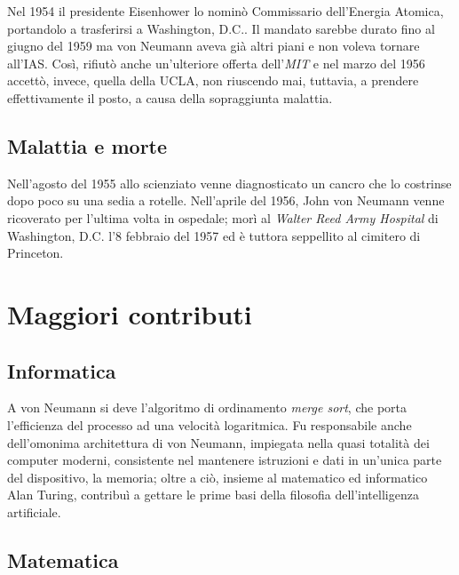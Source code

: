 \documentclass[a4paper, 12pt]{article}
\begin{document}
Nel 1954 il presidente Eisenhower lo nominò Commissario dell'Energia Atomica, portandolo a trasferirsi a Washington, D.C.. Il mandato sarebbe durato fino al giugno del 1959 ma von Neumann aveva già altri piani e non voleva tornare all'IAS. Così, rifiutò anche un'ulteriore offerta dell'\textit{MIT} e nel marzo del 1956 accettò, invece, quella della UCLA, non riuscendo mai, tuttavia, a prendere effettivamente il posto, a causa della sopraggiunta malattia.

\subsection{Malattia e morte}

Nell'agosto del 1955 allo scienziato venne diagnosticato un cancro che lo costrinse dopo poco su una sedia a rotelle. Nell'aprile del 1956, John von Neumann venne ricoverato per l'ultima volta in ospedale; morì al \textit{Walter Reed Army Hospital} di Washington, D.C. l'8 febbraio del 1957 ed è tuttora seppellito al cimitero di Princeton.

\section{Maggiori contributi}

\subsection{Informatica}

A von Neumann si deve l'algoritmo di ordinamento \textit{merge sort}, che porta l'efficienza del processo ad una velocità logaritmica. Fu responsabile anche dell'omonima architettura di von Neumann, impiegata nella quasi totalità dei computer moderni, consistente nel mantenere istruzioni e dati in un'unica parte del dispositivo, la memoria; oltre a ciò, insieme al matematico ed informatico Alan Turing, contribuì a gettare le prime basi della filosofia dell'intelligenza artificiale.


\subsection{Matematica}
\end{document}
